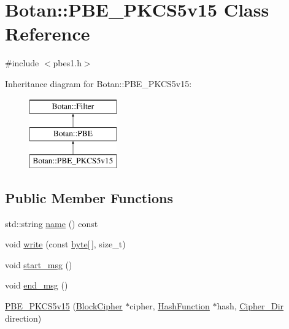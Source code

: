 \hypertarget{classBotan_1_1PBE__PKCS5v15}{\section{Botan\-:\-:P\-B\-E\-\_\-\-P\-K\-C\-S5v15 Class Reference}
\label{classBotan_1_1PBE__PKCS5v15}
}


{\ttfamily \#include $<$pbes1.\-h$>$}

Inheritance diagram for Botan\-:\-:P\-B\-E\-\_\-\-P\-K\-C\-S5v15\-:\begin{figure}[H]
\begin{center}
\leavevmode
\includegraphics[height=3.000000cm]{classBotan_1_1PBE__PKCS5v15}
\end{center}
\end{figure}
\subsection*{Public Member Functions}
\begin{DoxyCompactItemize}
\item 
std\-::string \hyperlink{classBotan_1_1PBE__PKCS5v15_a33f72dc5881a09d980cfe9ec5a1462da}{name} () const 
\item 
void \hyperlink{classBotan_1_1PBE__PKCS5v15_a0f4588533525a0639dd923d3e494244e}{write} (const \hyperlink{namespaceBotan_a7d793989d801281df48c6b19616b8b84}{byte}\mbox{[}$\,$\mbox{]}, size\-\_\-t)
\item 
void \hyperlink{classBotan_1_1PBE__PKCS5v15_ae17c4268f38991883e456d284726378c}{start\-\_\-msg} ()
\item 
void \hyperlink{classBotan_1_1PBE__PKCS5v15_ae5964560ed740da2ba1028e569a6f9cb}{end\-\_\-msg} ()
\item 
\hyperlink{classBotan_1_1PBE__PKCS5v15_a784dc6a99c5e05491f98d3c8874c43b3}{P\-B\-E\-\_\-\-P\-K\-C\-S5v15} (\hyperlink{classBotan_1_1BlockCipher}{Block\-Cipher} $\ast$cipher, \hyperlink{classBotan_1_1HashFunction}{Hash\-Function} $\ast$hash, \hyperlink{namespaceBotan_ad9d14ffdc73fc19966421979b32ee759}{Cipher\-\_\-\-Dir} direction)
\end{DoxyCompactItemize}
